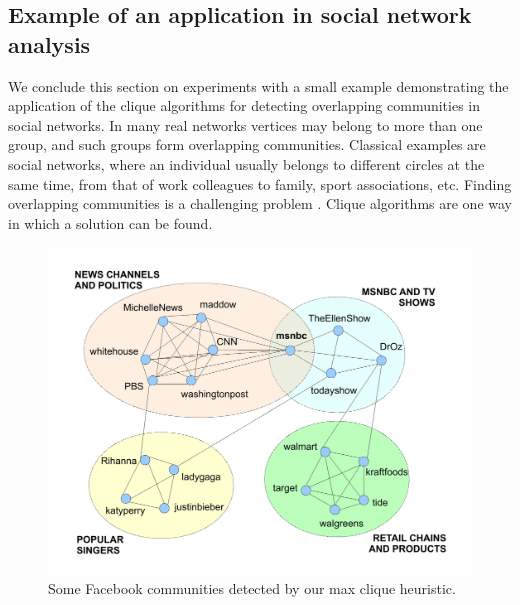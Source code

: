 \subsection{Example of an application in social network analysis}
\label{sec:applications}

We conclude this section on experiments with a small example 
demonstrating the application of the clique algorithms for detecting overlapping communities in social networks. 
In many real networks vertices may belong to more than one group, and such groups form overlapping communities. Classical examples are social networks, where an individual usually belongs to different circles at the same time, from that of work colleagues to family, sport associations, etc. 
Finding overlapping communities is a challenging problem \cite{Fortunato_2010}.
Clique algorithms are one way in which a solution can be found.  

\begin{figure}%
  \centering
    \includegraphics[width=1\textwidth]{communities.pdf}
  \caption{Some Facebook communities detected by our max clique heuristic.}
\label{fig-communities}
\end{figure}

